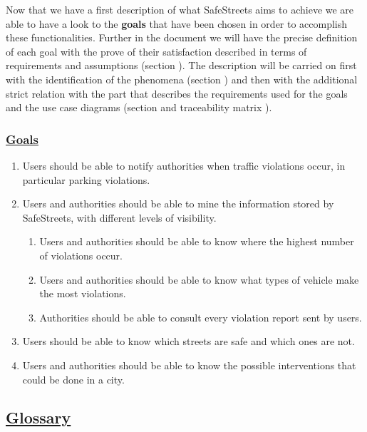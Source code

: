 	 Now that we have a first description of what SafeStreets aims to achieve we are able to have a look to the \textbf{goals} that have been chosen in order to accomplish these functionalities. Further in the document we will have the precise definition of each goal with the prove of their satisfaction described in terms of requirements and assumptions (section ). The description will be carried on first with the identification of the phenomena (section ) and then with the additional strict relation with the part that describes the requirements used for the goals and the use case diagrams (section  and traceability matrix ). 
	
	\subsubsection[Goals]{\hyperlink{toc}{Goals}}
		\label{sec:goals}
		\begin{enumerate}[label=\textbf{G\arabic*}]
			\item \label{goal:notification} Users should be able to notify authorities when traffic violations occur, in particular parking violations.
			\item \label{goal:mining} Users and authorities should be able to mine the information stored by SafeStreets, with different levels of visibility.
				\begin{enumerate}[label=\textbf{G2\Alph*}]
					\item \label{goal:miningA} Users and authorities should be able to know where the highest number of violations occur.
					\item \label{goal:miningB} Users and authorities should be able to know what types of vehicle make the most violations.
					\item \label{goal:miningC} Authorities should be able to consult every violation report sent by users.
				\end{enumerate}
			\item \label{goal:safety} Users should be able to know which streets are safe and which ones are not.
			\item \label{goal:intervention} Users and authorities should be able to know the possible interventions that could be done in a city.
		\end{enumerate}
	
\subsection[Glossary]{\hyperlink{toc}{Glossary}}
	\label{sec:glossary}
	
